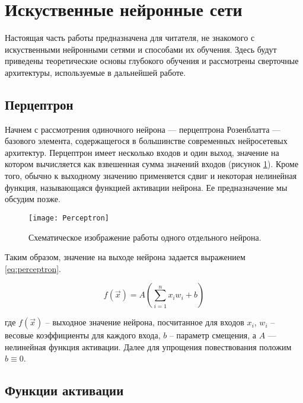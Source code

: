 \section{Искуственные нейронные сети}

\indent
\indent
Настоящая часть работы предназначена для читателя, не знакомого с 
искуственными нейронными сетями и способами их обучения. 
Здесь будут приведены теоретические 
основы глубокого обучения и рассмотрены сверточные архитектуры, 
используемые в дальнейшей работе.


\subsection{Перцептрон}

\indent
Начнем с рассмотрения одиночного нейрона
 --- перцептрона Розенблатта --- базового элемента, содержащегося в большинстве современных нейросетевых архитектур.
Перцептрон имеет несколько входов и один выход, значение на котором
вычисляется как взвешенная сумма значений входов 
(рисунок \ref{tikzpicture: perceptron}).
Кроме того, обычно
к выходному значению применяется сдвиг и некоторая нелинейная функция, 
называющаяся функцией активации нейрона. Ее предназначение мы обсудим позже.

\begin{figure}[h!]
    \begin{center}
   	    \texttt{[image: Perceptron]}
   	\end{center}
   	\caption{Схематическое изображение работы одного отдельного нейрона.}
   	\label{tikzpicture: perceptron}
\end{figure}


\indent
\indent
Таким образом, значение на выходе нейрона задается
 выражением \ref{eq:perceptron}.

\begin{equation}\label{eq:perceptron}
    f(\vec{x}) = A(\sum_{i=1}^n x_i w_i + b)
\end{equation}


где $f(\vec{x})$ -- выходное значение нейрона, посчитанное для входов $x_i$,
$w_i$ -- весовые коэффициенты для каждого входа, $b$ -- параметр смещения, 
а $A$ --- нелинейная функция активации. Далее для упрощения повествования
положим $b \equiv 0$.

\subsection{Функции активации}

